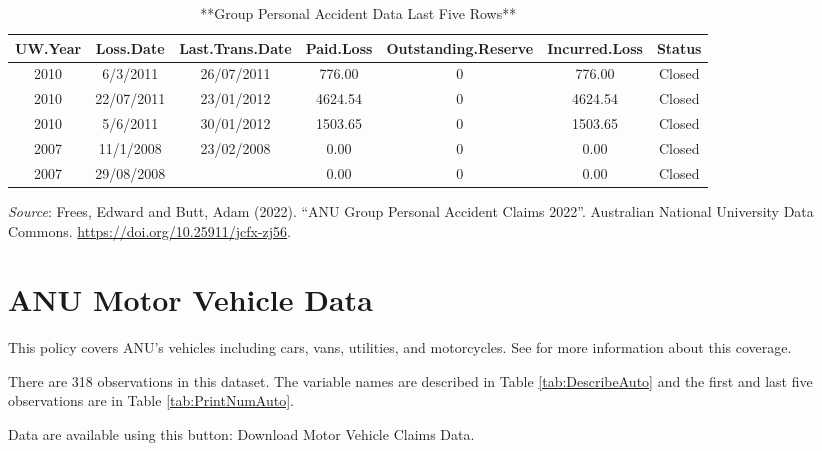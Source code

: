 \documentclass[
]{book}
\begin{document}
\begin{table}

\caption{\label{tab:PrintNumGPA}**Group Personal Accident Data Last Five Rows**}
\centering
\begin{tabular}[t]{c|c|c|c|c|c|c}
\hline
UW.Year & Loss.Date & Last.Trans.Date & Paid.Loss & Outstanding.Reserve & Incurred.Loss & Status\\
\hline
2010 & 6/3/2011 & 26/07/2011 & 776.00 & 0 & 776.00 & Closed\\
\hline
2010 & 22/07/2011 & 23/01/2012 & 4624.54 & 0 & 4624.54 & Closed\\
\hline
2010 & 5/6/2011 & 30/01/2012 & 1503.65 & 0 & 1503.65 & Closed\\
\hline
2007 & 11/1/2008 & 23/02/2008 & 0.00 & 0 & 0.00 & Closed\\
\hline
2007 & 29/08/2008 &  & 0.00 & 0 & 0.00 & Closed\\
\hline
\end{tabular}
\end{table}

\emph{Source}: Frees, Edward and Butt, Adam (2022). ``ANU Group Personal Accident Claims 2022''. Australian National University Data Commons. \url{https://doi.org/10.25911/jcfx-zj56}.

\hypertarget{Sec:DataAuto}{%
\section{ANU Motor Vehicle Data}\label{Sec:DataAuto}}

This policy covers ANU's vehicles including cars, vans, utilities, and motorcycles. See \citet{frees2022ANURisks} for more information about this coverage.

There are 318 observations in this dataset. The variable names are described in Table \ref{tab:DescribeAuto} and the first and last five observations are in Table \ref{tab:PrintNumAuto}.

Data are available using this button:
Download Motor Vehicle Claims Data.
\end{document}
